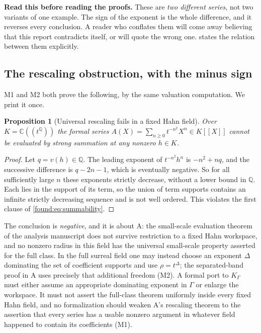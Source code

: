 \documentclass[11pt,letterpaper]{article}
\numberwithin{equation}{section}
\newtheorem{proposition}[theorem]{Proposition}
\theoremstyle{definition}
\theoremstyle{remark}
\newcommand{\C}{\mathbb C}
\newcommand{\Q}{\mathbb Q}
\begin{document}
\noindent\textbf{Read this before reading the proofs.} These are \emph{two
different series}, not two variants of one example. The sign of the exponent is
the whole difference, and it reverses every conclusion. A reader who conflates
them will come away believing that this report contradicts itself, or will
quote the wrong one.  states the relation between
them explicitly.

\subsection{The rescaling obstruction, with the minus sign}
\label{found:sub:rescaling}
M1 and M2 both prove the following, by the same valuation computation. We print
it once.

\begin{proposition}[Universal rescaling fails in a fixed Hahn field]\label{found:ex:rescaling}
Over $K=\C((t^\Q))$ the formal series $A(X)=\sum_{n\ge0}t^{-n^2}X^n\in K[[X]]$
cannot be evaluated by strong summation at \emph{any} nonzero $h\in K$.
\end{proposition}
\begin{proof}
Let $q=v(h)\in\Q$. The leading exponent of $t^{-n^2}h^n$ is $-n^2+nq$, and the
successive difference is $q-2n-1$, which is eventually negative. So for all
sufficiently large $n$ these exponents strictly decrease, without a lower bound
in $\Q$. Each lies in the support of its term, so the union of term supports
contains an infinite strictly decreasing sequence and is not well ordered. This
violates the first clause of \eqref{found:eq:summability}.
\end{proof}

The conclusion is \emph{negative}, and it is about A: the small-scale evaluation
theorem of the analysis manuscript does not survive restriction to a fixed Hahn
workspace, and no nonzero radius in this field has the universal small-scale
property asserted for the full class. In the full surreal field one may instead
choose an exponent $\Delta$ dominating the set of coefficient supports and use
$\rho=t^\Delta$; the separated-band proof in A uses precisely that additional
freedom (M2). A formal port to $K_\Gamma$ must either assume an appropriate
dominating exponent in $\Gamma$ or enlarge the workspace. It must not assert the
full-class theorem uniformly inside every fixed Hahn field, and no formalization
should weaken A's rescaling theorem to the assertion that every series has a
usable nonzero argument in whatever field happened to contain its coefficients
(M1).
\end{document}
